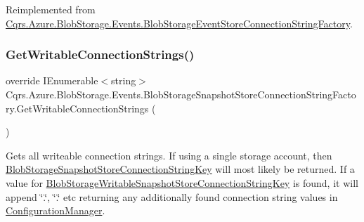 Reimplemented from \hyperlink{classCqrs_1_1Azure_1_1BlobStorage_1_1Events_1_1BlobStorageEventStoreConnectionStringFactory_aa47606e4cd5a71437bed71e07fda53ed_aa47606e4cd5a71437bed71e07fda53ed}{Cqrs.\+Azure.\+Blob\+Storage.\+Events.\+Blob\+Storage\+Event\+Store\+Connection\+String\+Factory}.

\mbox{\label{classCqrs_1_1Azure_1_1BlobStorage_1_1Events_1_1BlobStorageSnapshotStoreConnectionStringFactory_a3b0a626033bedf1dc33951266ac656e4_a3b0a626033bedf1dc33951266ac656e4}} 
\subsubsection{\texorpdfstring{Get\+Writable\+Connection\+Strings()}{GetWritableConnectionStrings()}}
{\footnotesize\ttfamily override I\+Enumerable$<$string$>$ Cqrs.\+Azure.\+Blob\+Storage.\+Events.\+Blob\+Storage\+Snapshot\+Store\+Connection\+String\+Factory.\+Get\+Writable\+Connection\+Strings (\begin{DoxyParamCaption}{ }\end{DoxyParamCaption})\hspace{0.3cm}{\ttfamily [virtual]}}



Gets all writeable connection strings. If using a single storage account, then \hyperlink{classCqrs_1_1Azure_1_1BlobStorage_1_1Events_1_1BlobStorageSnapshotStoreConnectionStringFactory_a9638ce6d0077def1e742b688e4581874_a9638ce6d0077def1e742b688e4581874}{Blob\+Storage\+Snapshot\+Store\+Connection\+String\+Key} will most likely be returned. If a value for \hyperlink{classCqrs_1_1Azure_1_1BlobStorage_1_1Events_1_1BlobStorageSnapshotStoreConnectionStringFactory_a5b920e37137fbfb098eb74a7177c1de7_a5b920e37137fbfb098eb74a7177c1de7}{Blob\+Storage\+Writable\+Snapshot\+Store\+Connection\+String\+Key} is found, it will append \char`\"{}.\char`\"{}, \char`\"{}.\char`\"{} etc returning any additionally found connection string values in \hyperlink{namespaceCqrs_1_1Azure_1_1ConfigurationManager}{Configuration\+Manager}. 



